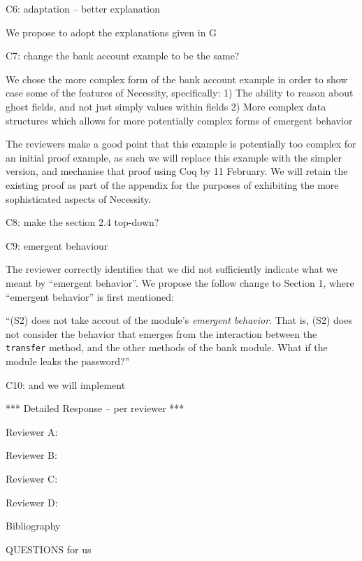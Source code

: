 C6: adaptation -- better explanation

We propose to adopt the explanations given in G

C7: change the bank account example to be the same?
 
 We chose the more complex form of the bank account example in order to show case some of the features of Necessity, specifically:
1) The ability to reason about ghost fields, and not just simply values within fields
2) More complex data structures which allows for more potentially complex forms of emergent behavior

The reviewers make a good point that this example is potentially too complex for an initial proof example, as such we will 
replace this example with the simpler version, and mechanise that proof using Coq by 11 February. We will retain the existing proof as part 
of the appendix for the purposes of exhibiting the more sophisticated aspects of Necessity.
 
C8: make the section 2.4 top-down?

C9: emergent behaviour 

 The reviewer correctly identifies that we did not sufficiently indicate what we meant by ``emergent behavior''. We propose the follow change 
to Section 1, where ``emergent behavior'' is first mentioned:

``(S2) does not take accout of the module's \emph{emergent behavior}. That is, (S2) does not consider the behavior that emerges from the interaction between the 
\texttt{transfer} method, and the other methods of the bank module. What if the module leaks the password?''

 
C10: and we will implement
 


*** Detailed Response -- per reviewer ***

Reviewer A:

Reviewer B:

Reviewer C:

Reviewer D:

Bibliography



QUESTIONS for us